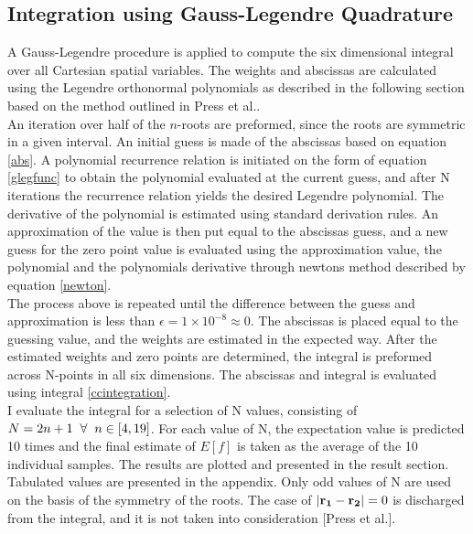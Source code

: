 \documentclass[%
reprint,nofootinbib,
amsmath,amssymb,
aps,
]{revtex4-1}
\begin{document}
\subsection{Integration using Gauss-Legendre Quadrature}\noindent 
A Gauss-Legendre procedure is applied to compute the six dimensional integral over all Cartesian spatial variables. The weights and abscissas are calculated using the Legendre orthonormal  polynomials as described in the following section based on the method outlined in Press et al.. \\ \indent  
An iteration over half of the $n$-roots are preformed, since the roots are symmetric in a given interval. An initial guess is made of the abscissas based on equation \ref{abs}. A polynomial recurrence relation is initiated on the form of equation \ref{glegfunc} to obtain the polynomial evaluated at the current guess, and after N iterations the recurrence relation yields the desired Legendre polynomial. The derivative of the polynomial is estimated using standard derivation rules. An approximation of the value is then put equal to the abscissas guess, and a new guess for the zero point value is evaluated using the approximation value, the polynomial and the polynomials derivative through newtons method described by equation \ref{newton}.\\ \indent The process above is repeated until the difference between the guess and approximation is less than $\epsilon = 1\times 10^{-8} \approx 0$. The abscissas is placed equal to the guessing value, and the weights are estimated in the expected way. After the estimated weights and zero points are determined, the integral is preformed across N-points in all six dimensions. The abscissas and integral is evaluated using integral \ref{ccintegration}. \\ \indent I evaluate the integral for a selection of N values, consisting of $N = 2n+1 \hspace{2mm} \forall \hspace{2mm}n\in[4,19]$. For each value of N, the expectation value is predicted 10 times and the final estimate of $E[f]$ is taken as the average of the 10 individual samples. The results are plotted and presented in the result section. Tabulated values are presented in the appendix. Only odd values of N are used on the basis of the symmetry of the roots. The case of  $\abs{\mathbf{r_1} -\mathbf{r_2}} = 0$ is discharged from the integral, and it is not taken into consideration [Press et al.].
\end{document}
